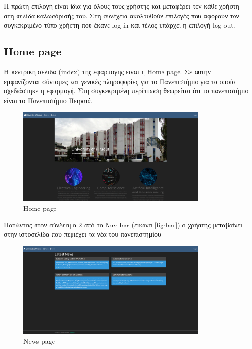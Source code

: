 \documentclass[12pt]{article}
\begin{document}
	Η πρώτη επιλογή είναι ίδια για όλους τους χρήστης και μεταφέρει τον κάθε χρήστη στη σελίδα καλωσόρισής του. Στη συνέχεια ακολουθούν επιλογές που αφορούν τον συγκεκριμένο τύπο χρήστη που έκανε log in και τέλος υπάρχει η επιλογή log out.
	
	
	\subsection{Home page}
	
	Η κεντρική σελίδα (index) της εφαρμογής είναι η Home page. Σε αυτήν εμφανίζονται σύντομες και γενικές πληροφορίες για το Πανεπιστήμιο για το οποίο σχεδιάστηκε η εφαρμογή. Στη συγκεκριμένη περίπτωση θεωρείται ότι το πανεπιστήμιο είναι το Πανεπιστήμιο Πειραιά. 
	
	\begin{figure}[H]
		\centering
		\includegraphics[width=0.85\textwidth]{homes3.png}
		\caption{Home page}
		\label{fig:homes}
	\end{figure}
	
	
	Πατώντας στον σύνδεσμο 2 από το Nav bar (εικόνα \ref{fig:bar}) ο χρήστης μεταβαίνει στην ιστοσελίδα που περιέχει τα νέα του πανεπιστημίου.
	
	\begin{figure}[H]
		\centering
		\includegraphics[width=0.85\textwidth]{news.png}
		\caption{News page}
		\label{fig:emptyView}
	\end{figure}
	
\end{document}
